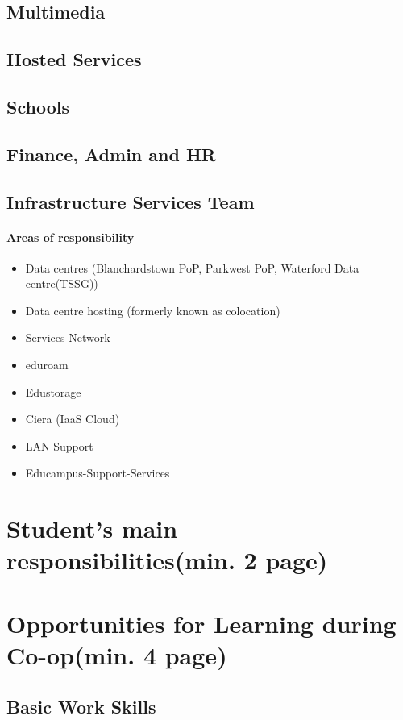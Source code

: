 \documentclass{article}
\begin{document}
\subsection{Multimedia}
\subsection{Hosted Services}
\subsection{Schools}
\subsection{Finance, Admin and HR}
\subsection{Infrastructure Services Team}
\paragraph{Areas of responsibility}
\begin{itemize}
	\item Data centres (Blanchardstown PoP, Parkwest PoP, Waterford Data centre(TSSG))
	\item Data centre hosting (formerly known as colocation) 
	\item Services Network
	\item eduroam
	\item Edustorage
	\item Ciera (IaaS Cloud)
	\item LAN Support
	\item Educampus-Support-Services
\end{itemize}
	
	
\newpage
	
\section{Student's main responsibilities(min. 2 page)}
	
\newpage
	
\section{Opportunities for Learning during Co-op(min. 4 page)}
\subsection{Basic Work Skills}
	
\end{document}
